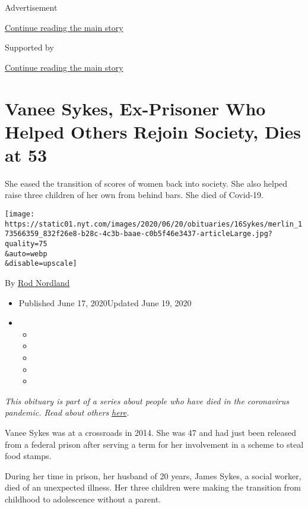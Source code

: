 Advertisement

\protect\hyperlink{after-top}{Continue reading the main story}

Supported by

\protect\hyperlink{after-sponsor}{Continue reading the main story}

\hypertarget{vanee-sykes-ex-prisoner-who-helped-others-rejoin-society-dies-at-53}{%
\section{Vanee Sykes, Ex-Prisoner Who Helped Others Rejoin Society, Dies
at
53}\label{vanee-sykes-ex-prisoner-who-helped-others-rejoin-society-dies-at-53}}

She eased the transition of scores of women back into society. She also
helped raise three children of her own from behind bars. She died of
Covid-19.

\texttt{[image: https://static01.nyt.com/images/2020/06/20/obituaries/16Sykes/merlin\_173566359\_832f26e8-b28c-4c3b-baae-c0b5f46e3437-articleLarge.jpg?quality=75\\\&auto=webp\\\&disable=upscale]}

By \href{https://www.nytimes.com/by/rod-nordland}{Rod Nordland}

\begin{itemize}
\item
  Published June 17, 2020Updated June 19, 2020
\item
  \begin{itemize}
  \item
  \item
  \item
  \item
  \item
  \end{itemize}
\end{itemize}

\emph{This obituary is part of a series about people who have died in
the coronavirus pandemic. Read about others}
\href{https://www.nytimes.com/interactive/2020/obituaries/people-died-coronavirus-obituaries.html}{\emph{here}}\emph{.}

Vanee Sykes was at a crossroads in 2014. She was 47 and had just been
released from a federal prison after serving a term for her involvement
in a scheme to steal food stamps.

During her time in prison, her husband of 20 years, James Sykes, a
social worker, died of an unexpected illness. Her three children were
making the transition from childhood to adolescence without a parent.

